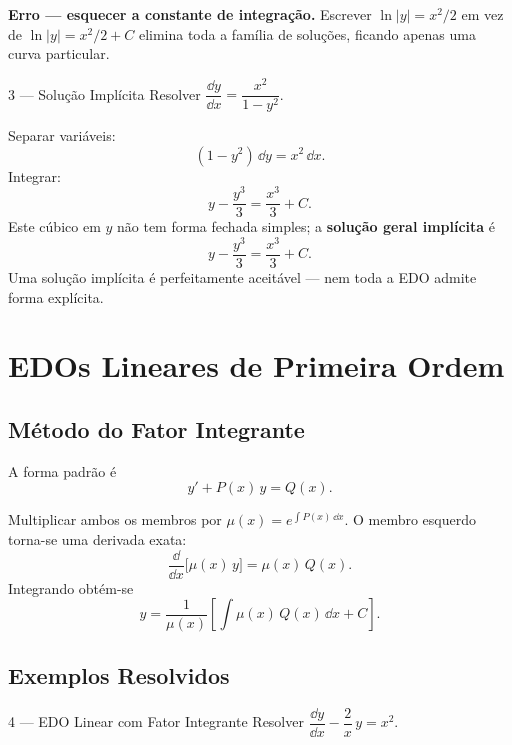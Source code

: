 \begin{warnbox}
  \textbf{Erro --- esquecer a constante de integração.} Escrever
  $\ln|y| = x^2/2$ em vez de $\ln|y| = x^2/2 + C$ elimina toda a família de
  soluções, ficando apenas uma curva particular.
\end{warnbox}

\begin{exbox}{3 --- Solução Implícita}
  Resolver $\dfrac{\dd y}{\dd x} = \dfrac{x^2}{1-y^2}$.
\end{exbox}

\begin{solbox}
  Separar variáveis:
  \[
    (1-y^2)\,\dd y = x^2\,\dd x.
  \]
  Integrar:
  \[
    y - \frac{y^3}{3} = \frac{x^3}{3} + C.
  \]
  Este cúbico em $y$ não tem forma fechada simples; a \textbf{solução geral implícita} é
  \[
    \boxed{y - \frac{y^3}{3} = \frac{x^3}{3} + C.}
  \]
  Uma solução implícita é perfeitamente aceitável --- nem toda a EDO admite forma explícita.
\end{solbox}

\section{EDOs Lineares de Primeira Ordem}
\label{sec:linear5}

\subsection{Método do Fator Integrante}

A forma padrão é
\[
  y' + P(x)\,y = Q(x).
\]

\begin{thmbox}[title={Fator Integrante}]
  Multiplicar ambos os membros por $\mu(x) = e^{\int P(x)\,\dd x}$. O membro esquerdo
  torna-se uma derivada exata:
  \[
    \frac{\dd}{\dd x}\!\bigl[\mu(x)\,y\bigr] = \mu(x)\,Q(x).
  \]
  Integrando obtém-se
  \[
    y = \frac{1}{\mu(x)}\left[\int \mu(x)\,Q(x)\,\dd x + C\right].
  \]
\end{thmbox}

\subsection{Exemplos Resolvidos}

\begin{exbox}{4 --- EDO Linear com Fator Integrante}
  Resolver $\dfrac{\dd y}{\dd x} - \dfrac{2}{x}\,y = x^2$.
\end{exbox}

